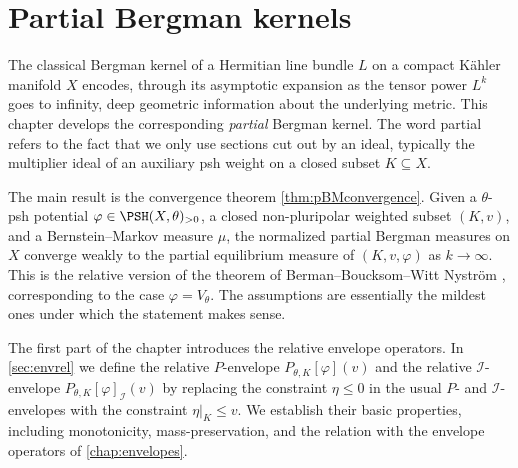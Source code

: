 \chapter{Partial Bergman kernels}
\label{chap:Bergman}

The classical Bergman kernel of a Hermitian line bundle $L$ on a compact Kähler manifold $X$ encodes, through its asymptotic expansion as the tensor power $L^k$ goes to infinity, deep geometric information about the underlying metric. This chapter develops the corresponding \emph{partial} Bergman kernel. The word partial refers to the fact that we only use sections cut out by an ideal, typically the multiplier ideal of an auxiliary psh weight on a closed subset $K\subseteq X$.

The main result is the convergence theorem \cref{thm:pBMconvergence}. Given a $\theta$-psh potential $\varphi\in \PSH(X,\theta)_{>0}$, a closed non-pluripolar weighted subset $(K,v)$, and a Bernstein--Markov measure $\mu$, the normalized partial Bergman measures on $X$ converge weakly to the partial equilibrium measure of $(K,v,\varphi)$ as $k\to\infty$. This is the relative version of the theorem of Berman--Boucksom--Witt Nystr\"om \cite{BBWN11}, corresponding to the case $\varphi=V_\theta$. The assumptions are essentially the mildest ones under which the statement makes sense.

The first part of the chapter introduces the relative envelope operators. In \cref{sec:envrel} we define the relative $P$-envelope $P_{\theta,K}[\varphi](v)$ and the relative $\mathcal{I}$-envelope $P_{\theta,K}[\varphi]_{\mathcal{I}}(v)$ by replacing the constraint $\eta\leq 0$ in the usual $P$- and $\mathcal{I}$-envelopes with the constraint $\eta|_K\leq v$. We establish their basic properties, including monotonicity, mass-preservation, and the relation with the envelope operators of \cref{chap:envelopes}.

